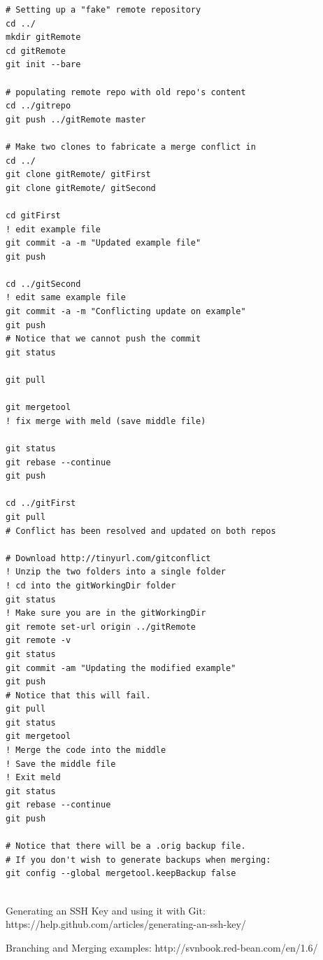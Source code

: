 \documentclass[oneside]{book}
\begin{document}
\begin{verbatim}
# Setting up a "fake" remote repository
cd ../
mkdir gitRemote
cd gitRemote
git init --bare

# populating remote repo with old repo's content
cd ../gitrepo
git push ../gitRemote master

# Make two clones to fabricate a merge conflict in
cd ../
git clone gitRemote/ gitFirst
git clone gitRemote/ gitSecond

cd gitFirst
! edit example file
git commit -a -m "Updated example file"
git push

cd ../gitSecond
! edit same example file
git commit -a -m "Conflicting update on example"
git push
# Notice that we cannot push the commit
git status

git pull

git mergetool
! fix merge with meld (save middle file)

git status
git rebase --continue
git push

cd ../gitFirst
git pull
# Conflict has been resolved and updated on both repos

# Download http://tinyurl.com/gitconflict
! Unzip the two folders into a single folder
! cd into the gitWorkingDir folder
git status
! Make sure you are in the gitWorkingDir
git remote set-url origin ../gitRemote
git remote -v
git status
git commit -am "Updating the modified example"
git push
# Notice that this will fail.
git pull
git status
git mergetool
! Merge the code into the middle
! Save the middle file
! Exit meld
git status
git rebase --continue
git push

# Notice that there will be a .orig backup file.
# If you don't wish to generate backups when merging:
git config --global mergetool.keepBackup false


\end{verbatim}

\begin{thebibliography}{10}
 Generating an SSH Key and using it with Git: 
https://help.github.com/articles/generating-an-ssh-key/

 Branching and Merging examples:
http://svnbook.red-bean.com/en/1.6/

\end{thebibliography}
\end{document}
